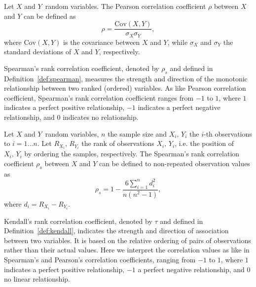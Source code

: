 \begin{definition}\label{def:pearson}
Let  $X$ and $Y$\ random variables. The Pearson correlation coefficient $\rho$ between $X$ and $Y$ can be defined as  
\begin{equation}
\rho = \frac{\mathrm{Cov}(X, Y)}{\sigma_X \sigma_Y},
\end{equation}
where $\mathrm{Cov}(X, Y)$ is the covariance between $X$ and $Y$, while $\sigma_X$ and $\sigma_Y$ the standard deviations of $X$ and $Y$, respectively. 
\end{definition}

Spearman's rank correlation coefficient, denoted by $\rho_s$ and defined in Definition~\ref{def:spearman}, measures the strength and direction of the monotonic relationship between two ranked (ordered) variables.  As like Pearson correlation coefficient, Spearman's rank correlation coefficient ranges from $-1$ to $1$, where $1$ indicates a perfect positive relationship, $-1$ indicates a perfect negative relationship, and $0$ indicates no relationship.
 
\begin{definition}\label{def:spearman}
Let $X$ and $Y$\ random variables, $n$ the sample size and $X_i, \, Y_i$ the $i$-th observations to $i = 1 \ldots n$. Let $R_{X_i}, \, R_{Y_i}$ the rank of observations $X_i, \, Y_i$, i.e. the position of $X_i, \, Y_i$ by ordering the samples, respectively. The Spearman's rank correlation coefficient  $\rho_s$ between $X$ and $Y$ can be defined to non-repeated observation values as 
\begin{equation}\label{eq:spearman}
\rho_s = 1 - \frac{6 \sum\limits_{i=1}^{n}d_i^2}{n(n^2 - 1)},
\end{equation}
where $d_i = R_{X_i} - R_{Y_i}$.
\end{definition}

Kendall's rank correlation coefficient, denoted by $\tau$ and defined in Definition~\ref{def:kendall},  indicates the strength and direction of association between two variables. It is based on the relative ordering of pairs of observations rather than their actual values. Here we interpret the correlation values as like in Spearman's and Pearson's correlation coefficients, ranging from $-1$ to $1$, where $1$ indicates a perfect positive relationship, $-1$ a perfect negative relationship, and $0$  no linear relationship.

